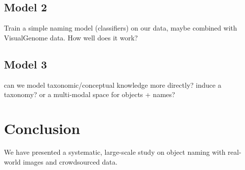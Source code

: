 \documentclass[11pt]{article}
\begin{document}
\subsection{Model 2}
Train a simple naming model (classifiers) on our data, maybe combined with VisualGenome data. How well does it work?

\subsection{Model 3}

can we model taxonomic/conceptual knowledge more directly? induce a taxonomy? or a multi-modal space for objects + names?

\section{Conclusion}

We have presented a systematic, large-scale study on object naming with real-world images and crowdsourced data.



\end{document}
